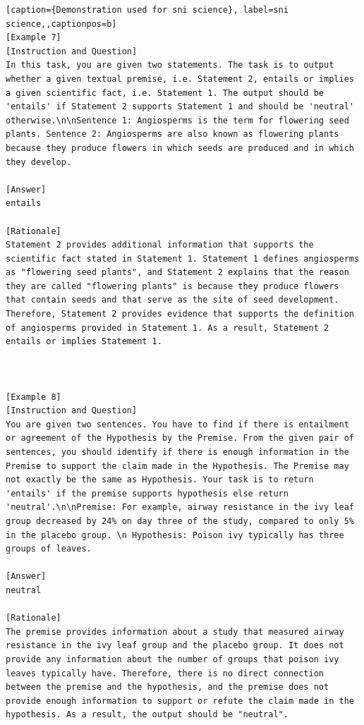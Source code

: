 \begin{lstlisting}[caption={Demonstration used for sni science}, label=sni science,,captionpos=b]
[Example 7]
[Instruction and Question]
In this task, you are given two statements. The task is to output whether a given textual premise, i.e. Statement 2, entails or implies a given scientific fact, i.e. Statement 1. The output should be 'entails' if Statement 2 supports Statement 1 and should be 'neutral' otherwise.\n\nSentence 1: Angiosperms is the term for flowering seed plants. Sentence 2: Angiosperms are also known as flowering plants because they produce flowers in which seeds are produced and in which they develop.

[Answer]
entails

[Rationale]
Statement 2 provides additional information that supports the scientific fact stated in Statement 1. Statement 1 defines angiosperms as "flowering seed plants", and Statement 2 explains that the reason they are called "flowering plants" is because they produce flowers that contain seeds and that serve as the site of seed development. Therefore, Statement 2 provides evidence that supports the definition of angiosperms provided in Statement 1. As a result, Statement 2 entails or implies Statement 1.



[Example 8]
[Instruction and Question]
You are given two sentences. You have to find if there is entailment or agreement of the Hypothesis by the Premise. From the given pair of sentences, you should identify if there is enough information in the Premise to support the claim made in the Hypothesis. The Premise may not exactly be the same as Hypothesis. Your task is to return 'entails' if the premise supports hypothesis else return 'neutral'.\n\nPremise: For example, airway resistance in the ivy leaf group decreased by 24% on day three of the study, compared to only 5% in the placebo group. \n Hypothesis: Poison ivy typically has three groups of leaves.

[Answer]
neutral

[Rationale]
The premise provides information about a study that measured airway resistance in the ivy leaf group and the placebo group. It does not provide any information about the number of groups that poison ivy leaves typically have. Therefore, there is no direct connection between the premise and the hypothesis, and the premise does not provide enough information to support or refute the claim made in the hypothesis. As a result, the output should be "neutral".




\end{lstlisting}
